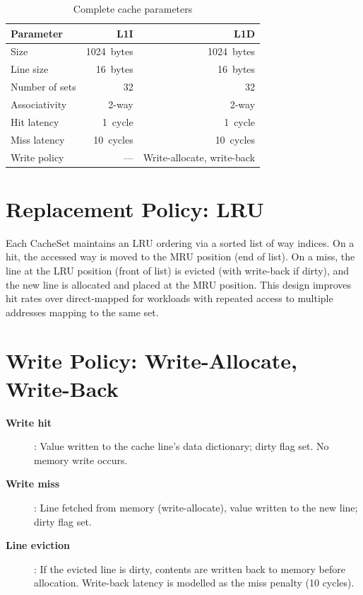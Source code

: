 \documentclass[12pt,a4paper,twoside]{book}
\theoremstyle{trinarytheorem}
\theoremstyle{trinarydefinition}
\newcommand{\code}[1]{\textsf{#1}}
\begin{document}
\begin{table}[H]
\centering
\caption{Complete cache parameters}
\label{tab:cacheparams2}
\begin{tabular}{lrr}
\toprule
Parameter & L1I & L1D \\
\midrule
Size & 1024~bytes & 1024~bytes \\
Line size & 16~bytes & 16~bytes \\
Number of sets & 32 & 32 \\
Associativity & 2-way & 2-way \\
Hit latency & 1~cycle & 1~cycle \\
Miss latency & 10~cycles & 10~cycles \\
Write policy & --- & Write-allocate, write-back \\
\bottomrule
\end{tabular}
\end{table}

\section{Replacement Policy: LRU}

Each \code{CacheSet} maintains an LRU ordering via a sorted list of
way indices. On a hit, the accessed way is moved to the MRU position
(end of list). On a miss, the line at the LRU position (front of list)
is evicted (with write-back if dirty), and the new line is allocated
and placed at the MRU position. This design improves hit rates over
direct-mapped for workloads with repeated access to multiple addresses
mapping to the same set.

\section{Write Policy: Write-Allocate, Write-Back}

\begin{description}
    \item[\textbf{Write hit}]: Value written to the cache line's data
          dictionary; dirty flag set. No memory write occurs.
    \item[\textbf{Write miss}]: Line fetched from memory (write-allocate),
          value written to the new line; dirty flag set.
    \item[\textbf{Line eviction}]: If the evicted line is dirty, contents
          are written back to memory before allocation. Write-back latency
          is modelled as the miss penalty (10 cycles).
\end{description}
\end{document}
